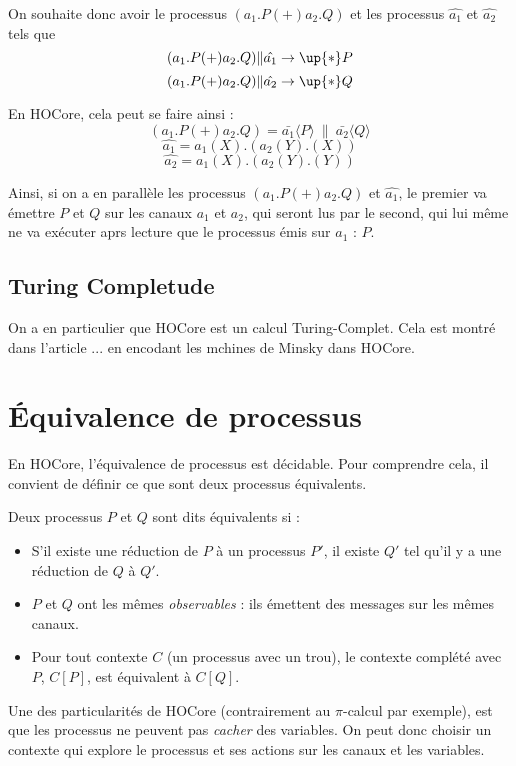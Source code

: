 \documentclass[11pt]{article}
\def\pic{$\pi$-calcul }
\def\+{(+)} %
\begin{document}
On souhaite donc avoir le processus $(a_1.P\+ a_2.Q)$ et les processus $\hat{a_1}$ et $\hat{a_2}$ tels que
$$(a_1.P\+ a_2.Q)\|\hat{a_1}\rightarrow\up{*}P$$
$$(a_1.P\+ a_2.Q)\|\hat{a_2}\rightarrow\up{*}Q$$

En HOCore, cela peut se faire ainsi :
$$(a_1.P\+ a_2.Q) = \bar{a_1}\langle P\rangle\ \|\ \bar{a_2}\langle Q\rangle$$
$$\hat{a_1} = a_1(X).(a_2(Y).(X))$$
$$\hat{a_2} = a_1(X).(a_2(Y).(Y))$$

Ainsi, si on a en parallèle les processus $(a_1.P\+ a_2.Q)$ et  $\hat{a_1}$, le premier va émettre $P$ et $Q$ sur les canaux $a_1$ et $a_2$, qui seront lus par le second, qui lui même ne va exécuter aprs lecture que le processus émis sur $a_1$ : $P$. %

\subsection{Turing Completude}
On a en particulier que HOCore est un calcul Turing-Complet. %
Cela est montré dans l'article ... en encodant les mchines de Minsky dans HOCore.


\section{Équivalence de processus}
En HOCore, l'équivalence de processus est décidable. Pour comprendre cela, il convient de définir ce que sont deux processus équivalents.

Deux processus $P$ et $Q$ sont dits équivalents si :
\begin{itemize}
\item S'il existe une réduction de $P$ à un processus $P'$, il existe $Q'$ tel qu'il y a une réduction de $Q$ à $Q'$. %
\item $P$ et $Q$ ont les mêmes \textit{observables} : ils émettent des messages sur les mêmes canaux.  
\item Pour tout contexte $C$ (un processus avec un trou), le contexte complété avec $P$, $C[P]$, est équivalent à $C[Q]$.
\end{itemize}
Une des particularités de HOCore (contrairement au \pic par exemple), est que les processus ne peuvent pas \textit{cacher} des variables. On peut donc choisir un contexte qui explore le processus et ses actions sur les canaux et les variables.
\end{document}
